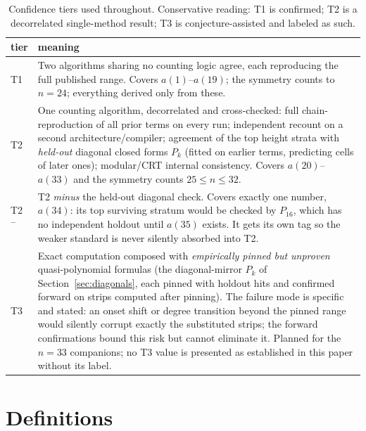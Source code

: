 \documentclass[11pt]{article}
\newcommand{\tierone}{\textsf{T1}}
\newcommand{\tiertwo}{\textsf{T2}}
\newcommand{\tierthree}{\textsf{T3}}
\newcommand{\tiertwominus}{\textsf{T2}$^{-}$}
\begin{document}
\begin{table}[H]
  \centering\small
  \begin{tabular}{l p{}}
    \toprule
    tier & meaning \\
    \midrule
    \tierone{} & Two algorithms sharing no counting logic agree, each
    reproducing the full published range. Covers $a(1)$--$a(19)$; the
    symmetry counts to $n=24$; everything derived only from these. \\
    \tiertwo{} & One counting algorithm, decorrelated and cross-checked:
    full chain-reproduction of all prior terms on every run; independent
    recount on a second architecture/compiler; agreement of the top height
    strata with \emph{held-out} diagonal closed forms $P_k$ (fitted on
    earlier terms, predicting cells of later ones); modular/CRT internal
    consistency. Covers $a(20)$--$a(33)$ and the symmetry counts
    $25\le n\le32$. \\
    \tiertwominus{} & \tiertwo{} \emph{minus} the held-out diagonal check.
    Covers exactly one number, $a(34)$: its top surviving stratum would be
    checked by $P_{16}$, which has no independent holdout until $a(35)$
    exists. It gets its own tag so the weaker standard is never silently
    absorbed into \tiertwo{}. \\
    \tierthree{} & Exact computation composed with \emph{empirically pinned
    but unproven} quasi-polynomial formulas (the diagonal-mirror $P_k$ of
    Section~\ref{sec:diagonals}, each pinned with holdout hits and confirmed
    forward on strips computed after pinning). The failure mode is specific
    and stated: an onset shift or degree transition beyond the pinned range
    would silently corrupt exactly the substituted strips; the forward
    confirmations bound this risk but cannot eliminate it. Planned for the
    $n=33$ companions; no \tierthree{} value is presented as established in
    this paper without its label. \\
    \bottomrule
  \end{tabular}
  \caption{Confidence tiers used throughout. Conservative reading: \tierone{}
  is confirmed; \tiertwo{} is a decorrelated single-method result;
  \tierthree{} is conjecture-assisted and labeled as such.}
  \label{tab:tiers}
\end{table}

\section{Definitions}
\label{sec:object}
\end{document}
